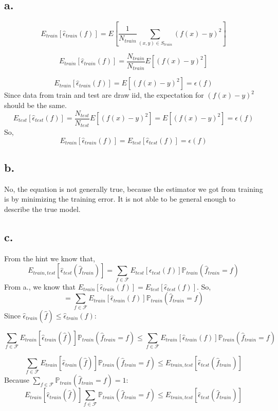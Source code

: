 \documentclass{article}
\begin{document}
\subsection*{a.}

\[ E_{train}[\hat{\epsilon}_{train}(f)] = E[ \frac{1}{N_{train}} \sum_{(x,y)\in S_{train}} (f(x)-y)^2 ] \]

\[ E_{train}[\hat{\epsilon}_{train}(f)] = \frac{N_{train}}{N_{train}} E[(f(x)-y)^2]\]

\[ E_{train}[\hat{\epsilon}_{train}(f)] = E[(f(x)-y)^2] =  \epsilon (f)\]
Since data from train and test are draw iid, the expectation for $(f(x)-y)^2$ should be the same.
\[E_{test}[\hat{\epsilon}_{test}(f)]  = \frac{N_{test}}{N_{test}} E[(f(x)-y)^2] = E[(f(x)-y)^2] =  \epsilon (f)\]
So,
\[E_{train}[\hat{\epsilon}_{train}(f)] = E_{test}[\hat{\epsilon}_{test}(f)] = \epsilon (f)\]


\subsection*{b.}
No, the equation is not generally true, because the estimator we got from training is by minimizing the training error. It is not able to be general enough to describe the true model.  
\subsection*{c.}
From the hint we know that,
\[
E_{train,test}[\hat{\epsilon}_{test}(\hat{f}_{train})]
= \sum_{f\in \mathcal{F}} E_{test}[\hat{\epsilon}_{test}(f)]  \mathbb{P}_{train}(\hat{f}_{train}=f)
\]
From a., we know that $ E_{train}[\hat{\epsilon}_{train}(f)] =  E_{test}[\hat{\epsilon}_{test}(f)]$. \newline
So, \[ = \sum_{f\in \mathcal{F}} E_{train}[\hat{\epsilon}_{train}(f)]  \mathbb{P}_{train}(\hat{f}_{train}=f) \]
Since $\hat{\epsilon}_{train}(\hat{f}) \le \hat{\epsilon}_{train}(f)$:

\[ \sum_{f\in \mathcal{F}} E_{train}[\hat{\epsilon}_{train}(\hat{f})]  \mathbb{P}_{train}(\hat{f}_{train}=f) \le \sum_{f\in \mathcal{F}} E_{train}[\hat{\epsilon}_{train}(f)]  \mathbb{P}_{train}(\hat{f}_{train}=f) \]

\[ \sum_{f\in \mathcal{F}} E_{train}[\hat{\epsilon}_{train}(\hat{f})]  \mathbb{P}_{train}(\hat{f}_{train}=f) \le  E_{train,test}[\hat{\epsilon}_{test}(\hat{f}_{train})] \]
Because $\sum_{f\in \mathcal{F}} \mathbb{P}_{train}(\hat{f}_{train}=f) = 1$:
\[ E_{train}[\hat{\epsilon}_{train}(\hat{f})] \sum_{f\in \mathcal{F}} \mathbb{P}_{train}(\hat{f}_{train}=f) \le  E_{train,test}[\hat{\epsilon}_{test}(\hat{f}_{train})] \] 
\end{document}
